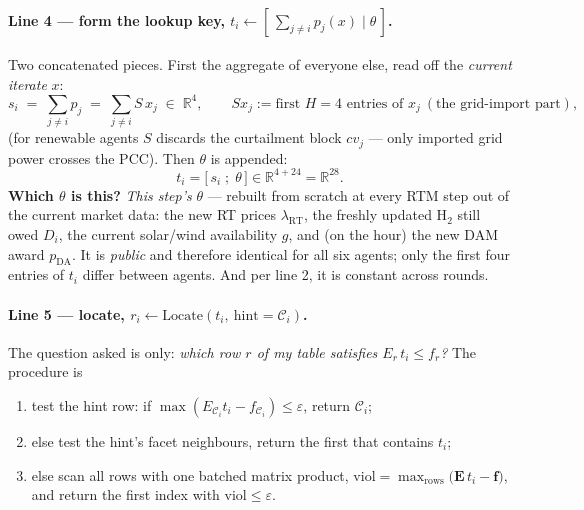 \documentclass[11pt, letterpaper]{article}
\begin{document}
\paragraph{Line 4 --- form the lookup key, $t_i\gets[\,\sum_{j\ne i}p_j(x)\;|\;\theta\,]$.}
Two concatenated pieces. First the aggregate of everyone else, read off the \emph{current iterate} $x$:
\[
  s_i \;=\; \sum_{j\ne i}p_j\;=\;\sum_{j\ne i} S\,x_j\;\in\;\mathbb R^{4},
  \qquad S x_j := \text{first } H{=}4 \text{ entries of } x_j\ (\text{the grid-import part}),
\]
(for renewable agents $S$ discards the curtailment block $cv_j$ --- only imported grid power crosses
the PCC). Then $\theta$ is appended:
\[
  t_i=\bigl[\,s_i\;;\;\theta\,\bigr]\in\mathbb R^{4+24}=\mathbb R^{28}.
\]
\textbf{Which $\theta$ is this?} \emph{This step's} $\theta$ --- rebuilt from scratch at every RTM
step out of the current market data: the new RT prices $\lambda_{\mathrm{RT}}$, the freshly updated
H$_2$ still owed $D_i$, the current solar/wind availability $g$, and (on the hour) the new DAM award
$p_{\mathrm{DA}}$. It is \emph{public} and therefore identical for all six agents; only the first four
entries of $t_i$ differ between agents. And per line 2, it is constant across rounds.

\paragraph{Line 5 --- locate, $r_i\gets\mathrm{Locate}(t_i,\ \mathrm{hint}=\mathcal C_i)$.}
The question asked is only: \emph{which row $r$ of my table satisfies $E_r\,t_i\le f_r$?} The
procedure is
\begin{enumerate}[leftmargin=1.8em,nosep,label=(\alph*)]
\item test the hint row: if $\max(E_{\mathcal C_i}t_i-f_{\mathcal C_i})\le\varepsilon$, return $\mathcal C_i$;
\item else test the hint's facet neighbours, return the first that contains $t_i$;
\item else scan all rows with one batched matrix product,
      $\mathrm{viol}=\max_{\text{rows}}\bigl(\mathbf E\,t_i-\mathbf f\bigr)$, and return the first
      index with $\mathrm{viol}\le\varepsilon$.
\end{enumerate}
\end{document}
